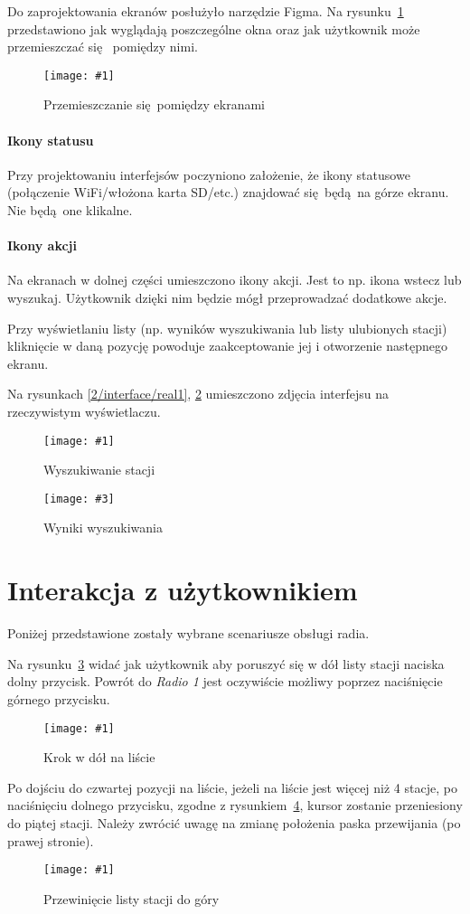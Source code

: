 \documentclass[polish]{aghengthesis}
\newcommand{\imgint}[4]{
	\begin{figure}[{#4}]
		\centering
		\texttt{[image: \#1]}
		\caption{#2}
		\label{#1}
	\end{figure}
}
\newcommand{\imgh}[3]{\imgint{#1}{#2}{#3}{H}}
\newcommand{\imgintss}[5]{
	\begin{figure}[{#5}]
		\centering
		\begin{minipage}{.45\textwidth}
			\centering
			\texttt{[image: \#1]}
			\caption{#2}
			\label{#1}
		\end{minipage}%
		\hfill
		\begin{minipage}{.45\textwidth}
			\centering
			\texttt{[image: \#3]}
			\caption{#4}
			\label{#3}
		\end{minipage}
	\end{figure}
}
\newcommand{\imghss}[4]{\imgintss{#1}{#2}{#3}{#4}{H}}
\begin{document}
		Do zaprojektowania ekranów posłużyło narzędzie Figma\textsuperscript{\cite{figma}}. Na rysunku~\ref{2/interface/all} przedstawiono jak wyglądają poszczególne okna oraz jak użytkownik może przemieszczać się  pomiędzy nimi.
		
		\imgh{2/interface/all}{Przemieszczanie się pomiędzy ekranami}{0.9}
		
		\paragraph{Ikony statusu}
			Przy projektowaniu interfejsów poczyniono założenie, że ikony statusowe (połączenie WiFi/włożona karta SD/etc.) znajdować się będą na górze ekranu. Nie będą one klikalne.
			
		\paragraph{Ikony akcji}
			Na ekranach w dolnej części umieszczono ikony akcji. Jest to np. ikona wstecz lub wyszukaj. Użytkownik dzięki nim będzie mógł przeprowadzać dodatkowe akcje.
		
		$ $\\
		Przy wyświetlaniu listy (np. wyników wyszukiwania lub listy ulubionych stacji) kliknięcie w daną pozycję powoduje zaakceptowanie jej i otworzenie następnego ekranu.
		
		Na rysunkach \ref{2/interface/real1}, \ref{2/interface/real2} umieszczono zdjęcia interfejsu na rzeczywistym wyświetlaczu.
		\imghss{2/interface/real1}{Wyszukiwanie stacji}{2/interface/real2}{Wyniki wyszukiwania}
	
	\section{Interakcja z użytkownikiem}
		Poniżej przedstawione zostały wybrane scenariusze obsługi radia.
		
		Na rysunku~\ref{2/btn/1} widać jak użytkownik aby poruszyć się w dół listy stacji naciska dolny przycisk. Powrót do \textit{Radio 1} jest oczywiście możliwy poprzez naciśnięcie górnego przycisku.
		\imgh{2/btn/1}{Krok w dół na liście}{0.7}
		
		Po dojściu do czwartej pozycji na liście, jeżeli na liście jest więcej niż 4 stacje, po naciśnięciu dolnego przycisku, zgodne z rysunkiem~\ref{2/btn/2}, kursor zostanie przeniesiony do piątej stacji. Należy zwrócić uwagę na zmianę położenia paska przewijania (po prawej stronie).
		\imgh{2/btn/2}{Przewinięcie listy stacji do góry}{0.7}
		
\end{document}
